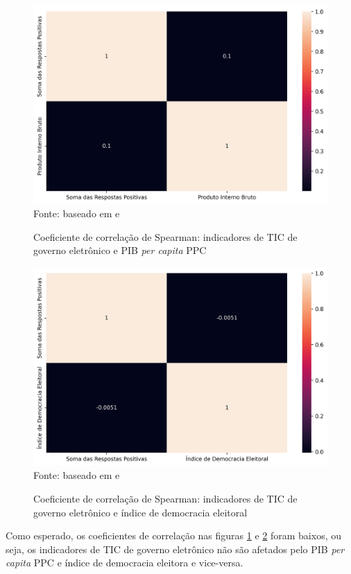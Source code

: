 \begin{figure}[H]
	\centering
	\caption{Coeficiente de correlação de Spearman: indicadores de TIC de governo eletrônico e PIB \textit{per capita} PPC}
	\includegraphics[width=1\linewidth]{figuras/ict_in_government/correlacao_ticegov_pib}
	\label{fig:correlacao_ticegov_pib}
	\footnotesize{Fonte: baseado em \cite{WB_pib_per_capita_países} e \cite{ONU_ICT_in_government_indicators}}
\end{figure}

\begin{figure}[H]
	\centering
	\caption{Coeficiente de correlação de Spearman: indicadores de TIC de governo eletrônico e índice de democracia eleitoral}
	\includegraphics[width=1\linewidth]{figuras/ict_in_government/correlacao_ticegov_indicedemocracia}
	\label{fig:correlacao_ticegov_indicedemocracia}
	\footnotesize{Fonte: baseado em \cite{electoral_democracy_index} e \cite{ONU_ICT_in_government_indicators}}
\end{figure}

Como esperado, os coeficientes de correlação nas figuras \ref{fig:correlacao_ticegov_pib} e \ref{fig:correlacao_ticegov_indicedemocracia} foram baixos, ou seja, os indicadores de TIC de governo eletrônico não são afetados pelo PIB \textit{per capita} PPC e índice de democracia eleitora e vice-versa.